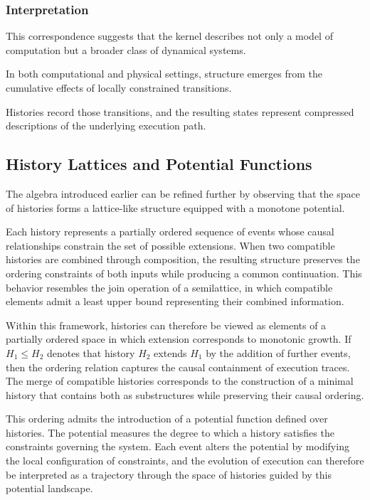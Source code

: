 \documentclass[12pt]{article}
\begin{document}
\subsubsection{Interpretation}

This correspondence suggests that the kernel
describes not only a model of computation but
a broader class of dynamical systems.

In both computational and physical settings,
structure emerges from the cumulative effects
of locally constrained transitions.

Histories record those transitions,
and the resulting states represent compressed
descriptions of the underlying execution path.

\subsection{History Lattices and Potential Functions}

The algebra introduced earlier can be refined further by
observing that the space of histories forms a lattice-like
structure equipped with a monotone potential.

Each history represents a partially ordered sequence of
events whose causal relationships constrain the set of
possible extensions. When two compatible histories are
combined through composition, the resulting structure
preserves the ordering constraints of both inputs while
producing a common continuation. This behavior resembles
the join operation of a semilattice, in which compatible
elements admit a least upper bound representing their
combined information.

Within this framework, histories can therefore be viewed
as elements of a partially ordered space in which extension
corresponds to monotonic growth. If $H_1 \leq H_2$ denotes
that history $H_2$ extends $H_1$ by the addition of further
events, then the ordering relation captures the causal
containment of execution traces. The merge of compatible
histories corresponds to the construction of a minimal
history that contains both as substructures while preserving
their causal ordering.

This ordering admits the introduction of a potential
function defined over histories. The potential measures
the degree to which a history satisfies the constraints
governing the system. Each event alters the potential by
modifying the local configuration of constraints, and the
evolution of execution can therefore be interpreted as a
trajectory through the space of histories guided by this
potential landscape.
\end{document}
